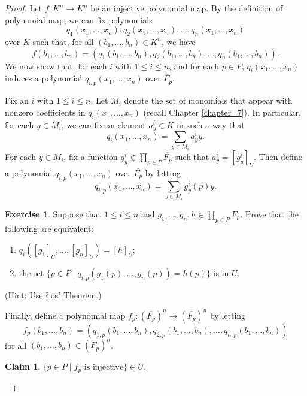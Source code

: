\documentclass[a4paper]{memoir}
\newtheorem{claim}[theorem]{Claim}
\theoremstyle{definition}
\newtheorem{exercise}[theorem]{Exercise}
\newcommand{\ra}{\rightarrow}
\begin{document}
\begin{proof}
  Let $f:K^n \ra K^n$ be an injective polynomial map. By the definition of polynomial map, 
  we can fix polynomials 
  \[
    q_1(x_1, \ldots, x_n), q_2(x_1, \ldots, x_n), \ldots, q_n(x_1, \ldots, x_n)
  \]
  over $K$ such that, for all $(b_1, \ldots, b_n) \in K^n$, we have
  \[
    f(b_1, \ldots, b_n) = (q_1(b_1, \ldots, b_n), q_2(b_1, \ldots, b_n), \ldots, q_n(b_1, \ldots, b_n)).
  \]
  We now show that, for each $i$ with $1 \leq i \leq n$, and for each $p \in P$, $q_i(x_1, \ldots, x_n)$ 
  induces a polynomial $q_{i,p}(x_1, \ldots, x_n)$ over $\overline{F_p}$. 
  
  Fix an $i$ with $1 \leq i \leq n$. Let $M_i$ denote the set of monomials that appear with 
  nonzero coefficients in $q_i(x_1, \ldots, x_n)$ (recall Chapter \ref{chapter_7}). In particular, 
  for each $y \in M_i$, we can fix an element $a^i_y \in K$ in such a way that 
  \[
    q_i(x_1, \ldots, x_n) = \sum_{y \in M_i} a^i_y y.
  \]
  For each $y \in M_i$, fix a function $g^i_y \in \prod_{p \in P} \overline{F_p}$ such 
  that $a^i_y = [g^i_y]_U$. Then define a polynomial $q_{i,p}(x_1, \ldots, x_n)$ over 
  $\overline{F_p}$ by letting 
  \[
    q_{i,p}(x_1, \ldots, x_n) = \sum_{y \in M_i} g^i_y(p) y.  
  \]
  
  \begin{exercise} \label{exercise: los_poly}
    Suppose that $1 \leq i \leq n$ and $g_1, \ldots, g_n, h \in \prod_{p \in P} 
    \overline{F_p}$. Prove that the following are equivalent:
    \begin{enumerate}
      \item $q_i([g_1]_U, \ldots, [g_n]_U) = [h]_U$;
      \item the set $\{p \in P \mid q_{i,p}(g_1(p), \ldots, g_n(p)) = h(p)\}$ is in $U$.
    \end{enumerate}
    (Hint: Use \L os' Theorem.)
  \end{exercise}  
  
  Finally, define a polynomial map $f_p : (\overline{F_p})^n \ra (\overline{F_p})^n$ by letting
  \[
    f_p(b_1, \ldots, b_n) = (q_{1,p}(b_1, \ldots, b_n), q_{2,p}(b_1, \ldots, b_n), \ldots, 
    q_{n,p}(b_1, \ldots, b_n))
  \]
  for all $(b_1, \ldots, b_n) \in (\overline{F_p})^n$.
  
  \begin{claim}
    $\{p \in P \mid f_p \text{ is injective}\} \in U$.
  \end{claim}
  

\end{proof}
\end{document}
